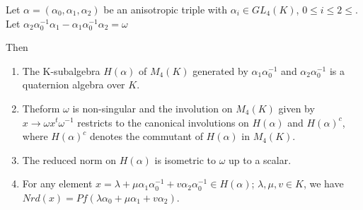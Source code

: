 \begin{thm}\label{thm3.5}
Let $\alpha=(\alpha_0,\alpha_1,\alpha_2)$ be an anisotropic triple with $\alpha_i\in GL_4(K)$, $0\leq i\leq 2\leq$. Let $\alpha_2\alpha^{-1}_0\alpha_1-\alpha_1\alpha_0^{-1}\alpha_2=\omega$

Then 
\begin{enumerate}
\renewcommand{\theenumi}{\roman{enumi}}
\renewcommand{\labelenumi}{(\theenumi)}
\item The K-subalgebra $H(\alpha)$ of $M_4(K)$ generated by $\alpha_1\alpha_0^{-1}$ and $\alpha_2\alpha_0^{-1}$ is a quaternion algebra over $K$. 

\item The\pageoriginale form $\omega$ is non-singular and the involution on $M_4(K)$ given by $x\to \omega x^{t}\omega^{-1}$ restricts to the canonical involutions on $H(\alpha)$ and $H(\alpha)^{c}$, where $H(\alpha)^{c}$ denotes the commutant of $H(\alpha)$ in $M_4(K)$. 

\item The reduced norm on $H(\alpha)$ is isometric to $\omega$ up to a scalar. 

\item For any element $x=\lambda+\mu \alpha_1\alpha_0^{-1}+v\alpha_2\alpha_0^{-1}\in H(\alpha)$; $\lambda, \mu, v\in K$, we have $Nrd(x)=Pf(\lambda \alpha_0+\mu\alpha_1+v\alpha_{2})$. 
\end{enumerate}
\end{thm}

